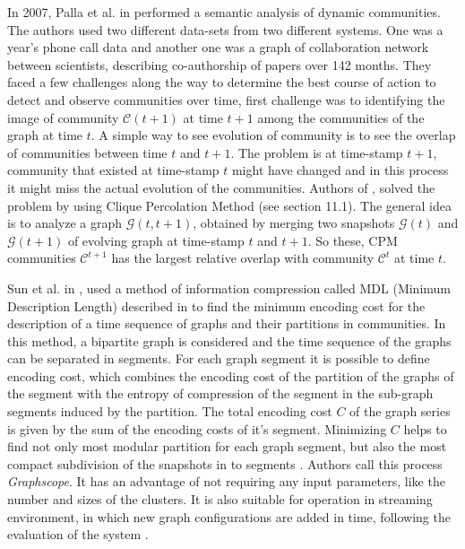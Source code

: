 In 2007, Palla et al. in \cite{ref-23} performed a semantic analysis of dynamic communities. The authors used two different data-sets from two different systems. One was a year's phone call data and another one was a graph of collaboration network between scientists, describing co-authorship of papers over 142 months. They faced a few challenges along the way to determine the best course of action to detect and observe communities over time, first challenge was to identifying the image of community $\mathcal{C}(t+1)$ at time $t+1$ among the communities of the graph at time $t$. A simple way to see evolution of community is to see the overlap of communities between time $t$ and $t+1$. The problem is at time-stamp $t+1$, community that existed at time-stamp $t$ might have changed and in this process it might miss the actual evolution of the communities. Authors of \cite{ref-23}, solved the problem by using Clique Percolation Method (see \cite{ref-6} section 11.1). The general idea is to analyze a graph $\mathcal{G}(t, t+1)$, obtained by merging two snapshots $\mathcal{G}(t)$ and $\mathcal{G}(t+1)$ of evolving graph at time-stamp $t$ and $t+1$. So these, CPM communities {$\mathcal{C}^{t+1}$} has the largest relative overlap with community {$\mathcal{C}^t$} at time $t$.

Sun et al. in \cite{ref-53}, used a method of information compression called MDL (Minimum Description Length) described in \cite{ref-54} to find the minimum encoding cost for the description of a time sequence of graphs and their partitions in communities. In this method, a bipartite graph is considered and the time sequence of the graphs can be separated in segments. For each graph segment it is possible to define encoding cost, which combines the encoding cost of the partition of the graphs of the segment with the entropy of compression of the segment in the sub-graph segments induced by the partition. The total encoding cost $C$ of the graph series is given by the sum of the encoding costs of it's segment. Minimizing $C$ helps to find not only most modular partition for each graph segment, but also the most compact subdivision of the snapshots in to segments \cite{ref-54}. Authors call this process \textit{Graphscope}. It has an advantage of not requiring any input parameters, like the number and sizes of the clusters. It is also suitable for operation in streaming environment, in which new graph configurations are added in time, following the evaluation of the system \cite{ref-53}.

